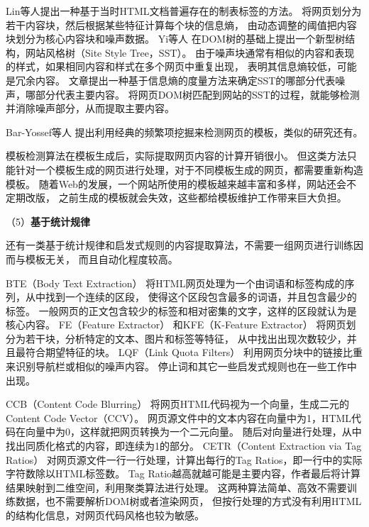 Lin等人提出一种基于当时HTML文档普遍存在的制表标签的方法。
将网页划分为若干内容块，然后根据某些特征计算每个块的信息熵，
由动态调整的阈值把内容块划分为核心内容块和噪声数据。
Yi等人
在DOM树的基础上提出一个新型树结构，网站风格树（Site Style Tree，SST）。
由于噪声块通常有相似的内容和表现的样式，如果相同内容和样式在多个网页中重复出现，
表明其信息熵较低，可能是冗余内容。
文章提出一种基于信息熵的度量方法来确定SST的哪部分代表噪声，哪部分代表主要内容。
将网页DOM树匹配到网站的SST的过程，就能够检测并消除噪声部分，从而提取主要内容。

Bar-Yossef等人
提出利用经典的频繁项挖掘来检测网页的模板，类似的研究还有\cite{chen2006template}。

模板检测算法在模板生成后，实际提取网页内容的计算开销很小。
但这类方法只能针对一个模板生成的网页进行处理，对于不同模板生成的网页，都需要重新构造模板。
随着Web的发展，一个网站所使用的模板越来越丰富和多样，网站还会不定期改版，
之前生成的模板就会失效，这些都给模板维护工作带来巨大负担。

（5）\textbf{基于统计规律}

还有一类基于统计规律和启发式规则的内容提取算法，不需要一组网页进行训练因而与模板无关，
而且自动化程度较高。

BTE（Body Text Extraction）
将HTML网页处理为一个由词语和标签构成的序列，从中找到一个连续的区段，
使得这个区段包含最多的词语，并且包含最少的标签。
一般网页的正文包含较少的标签和相对密集的文字，这样的区段就认为是核心内容。
FE（Feature Extractor）
和KFE（K-Feature Extractor）
将网页划分为若干块，分析特定的文本、图片和标签等特征，
从中找出出现次数较少，并且最符合期望特征的块。
LQF（Link Quota Filters）
利用网页分块中的链接比重来识别导航栏或相似的噪声内容。
停止词和其它一些启发式规则也在一些工作中出现。

CCB（Content Code Blurring）
将网页HTML代码视为一个向量，生成二元的Content Code Vector（CCV）。
网页源文件中的文本内容在向量中为1，HTML代码在向量中为0，这样就把网页转换为一个二元向量。
随后对向量进行处理，从中找出同质化格式的内容，即连续为1的部分。
CETR（Content Extraction via Tag Ratios）
对网页源文件一行一行处理，计算出每行的Tag Ratios，即一行中的实际字符数除以HTML标签数。
Tag Ratio越高就越可能是主要内容，作者最后将计算结果映射到二维空间，利用聚类算法进行处理。
这两种算法简单、高效不需要训练数据，也不需要解析DOM树或者渲染网页，
但按行处理的方式没有利用HTML的结构化信息，对网页代码风格也较为敏感。


